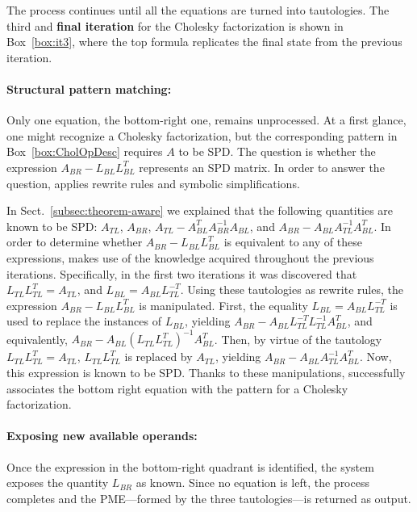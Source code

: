 \documentclass{llncs}
\newcommand{\click}{{\sc{Cl\makebox[.58\width][c]{1}ck}}}
\begin{document}
The process continues until all the equations are turned into tautologies.
The third and {\bf final iteration} for the Cholesky factorization
is shown in Box~\ref{box:it3}, where the top formula
replicates the final state from the previous iteration.

\paragraph{\bf Structural pattern matching:} Only one equation, the bottom-right one, remains unprocessed.  
At a first glance,
one might recognize a Cholesky factorization, but the corresponding
pattern in Box~\ref{box:CholOpDesc} requires $A$ to be SPD. The question is whether the expression $A_{BR} -
L_{BL} L_{BL}^T$ represents an SPD matrix. In
order to answer the question, \click{} applies rewrite rules and
symbolic simplifications.

In Sect.~\ref{subsec:theorem-aware} we explained
that the following quantities are known to be SPD: $A_{TL}$, $A_{BR}$,
$A_{TL} - A_{BL}^{T} A_{BR}^{-1} A_{BL}$, and $A_{BR} - A_{BL} A_{TL}^{-1} A_{BL}^{T}$.
In order to determine whether $A_{BR} - L_{BL} L_{BL}^T$
is equivalent to any of these expressions, \click{} makes use of the knowledge acquired throughout the previous iterations.
Specifically, in the first two iterations it was discovered that
$L_{TL} L_{TL}^T = A_{TL}$, and $L_{BL} = A_{BL} L_{TL}^{-T}$.
Using these tautologies as rewrite rules, the expression $A_{BR} -
L_{BL} L_{BL}^T$ is manipulated.  First, the equality $L_{BL} =
A_{BL} L_{TL}^{-T}$ is used to replace the instances of $L_{BL}$,
yielding $A_{BR} - A_{BL} L_{TL}^{-T} L_{TL}^{-1} A_{BL}^T$, and
equivalently, $A_{BR} - A_{BL} (L_{TL} L_{TL}^{T})^{-1}
A_{BL}^T$. Then, by virtue of the tautology $L_{TL} L_{TL}^T = A_{TL}$,
$L_{TL} L_{TL}^T$ is replaced by $A_{TL}$, yielding $A_{BR} - A_{BL}
A_{TL}^{-1} A_{BL}^{T}$. Now, this expression is known to be SPD.
Thanks to these manipulations, \click{} successfully associates the
bottom right equation with the pattern for a Cholesky factorization.

\paragraph{\bf Exposing new available operands:} 
Once the expression in the bottom-right quadrant is identified, 
the system exposes the quantity $L_{BR}$ as known.
Since no equation is left, the process completes and the PME---formed by the three
tautologies---is returned as output. 
\end{document}

